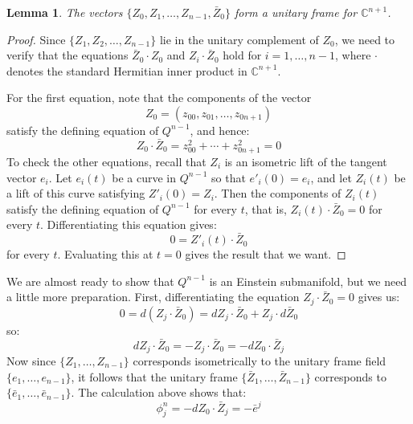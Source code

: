 \documentclass[11pt]{amsart}
\newtheorem{lem}[subsection]{Lemma}
\theoremstyle{definition}
\def \C{ \mathbb{C} }
\begin{document}
\begin{lem} The vectors $\{ Z_0, Z_1, \ldots, Z_{n-1}, \bar{Z}_0 \}$ form a unitary frame for $\C^{n+1}$.
\end{lem}

\begin{proof}  Since $\{ Z_1, Z_2, \ldots, Z_{n-1} \}$ lie in the unitary complement of $Z_0$, we need to verify that the equations $\bar{Z}_0 \cdot Z_0$ and $Z_i \cdot \bar{Z}_0$ hold for $i=1, \ldots, n-1$, where $\cdot$ denotes the standard Hermitian inner product in $\C^{n+1}$.

For the first equation, note that the components of the vector 
%
$$Z_0 = (z_{00}, z_{01}, \ldots, z_{0 n+1 })$$
%
satisfy the defining equation of $Q^{n-1}$, and hence:
%
$$ Z_0 \cdot \bar{Z}_0 = z_{00}^2 + \cdots + z_{0 n+1}^2 = 0 $$
%
To check the other equations, recall that $Z_i$ is an isometric lift of the tangent vector $e_i$.  Let $e_i(t)$ be a curve in $Q^{n-1}$ so that $e'_i(0) = e_i$, and let $Z_i(t)$ be a lift of this curve satisfying $Z'_i(0) = Z_i$.  Then the components of $Z_i(t)$ satisfy the defining equation of $Q^{n-1}$ for every $t$, that is, $Z_i(t) \cdot \bar{Z}_0 = 0$ for every $t$.  Differentiating this equation gives:
%
$$ 0 = Z'_i(t) \cdot \bar{Z}_0 $$
%
for every $t$.  Evaluating this at $t=0$ gives the result that we want.
\end{proof}

We are almost ready to show that $Q^{n-1}$ is an Einstein submanifold, but we need a little more preparation.  First, differentiating the equation $Z_j \cdot \bar{Z}_0 = 0$ gives us:
%
$$ 0 = d( Z_j \cdot \bar{Z}_0 ) = d Z_j \cdot \bar{Z}_0 + Z_j \cdot d \bar{Z}_0 $$
%
so:
%
$$ d Z_j \cdot \bar{Z}_0 = - Z_j \cdot \bar{Z}_0 = - d Z_0 \cdot \bar{Z}_j $$
%
Now since $\{ Z_1, \ldots, Z_{n-1 } \}$ corresponds isometrically to the unitary frame field $\{ e_1, \ldots, e_{n-1} \}$, it follows that the unitary frame $\{ \bar{Z}_1, \ldots, \bar{Z}_{n-1} \}$ corresponds to $\{ \bar{e}_1, \ldots, \bar{e}_{n-1} \}$.  The calculation above shows that:
%
$$ \phi^{n}_j = - d Z_0 \cdot \bar{Z}_j = - \bar{e}^j $$ 
\end{document}
